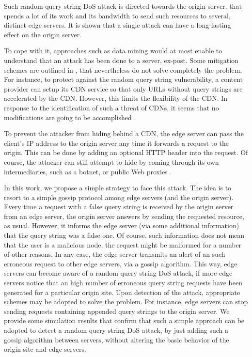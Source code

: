\documentclass{IEEEtran}
\begin{document}
Such random query string DoS attack is directed towards the origin server, that spends a lot of its work and its bandwidth to send such resources to several, distinct edge servers.
It is shown that a single attack can have a long-lasting effect on the origin server. 

To cope with it, approaches such as data mining would at most enable to understand that an attack has been done to a server, ex-post.
Some mitigation schemes are outlined in \cite{original}, that nevertheless do not solve completely the problem. 
For instance, to protect against the random query string vulnerability, a content provider can setup its CDN service so that only URLs without query strings are accelerated by the CDN. However, this limits the flexibility of the CDN. In response to the identification of such a threat of CDNs, it seems that no modifications are going to be accomplished \cite{spectrum}.

To prevent the attacker from hiding behind a CDN, the edge server can pass
the client's IP address to the origin server any time it forwards a request to the
origin. This can be done by adding an optional HTTP header into the request.
Of course, the attacker can still attempt to hide by coming through its own intermediaries, such as a botnet, or public Web proxies \cite{Ager:2010,original}. 

In this work, we propose a simple strategy to face this attack. The idea is to resort to a simple gossip protocol among edge servers (and the origin server). Every time a request with a false query string is received by the origin server from an edge server, the origin server answers by sending the requested resource, as usual. However, it informs the edge server (via some additional information) that the query string was a false one. Of course, such information does not mean that the user is a malicious node, the request might be malformed for a number of other reasons. In any case, the edge server transmits an alert of an such erroneous request to other edge servers, via a gossip algorithm. This way, edge servers can become aware of a random query string DoS attack, if more edge servers notice that an high number of erroneous query string requests have been generated for a particular origin site. Upon detection of the attack, appropriate schemes may be adopted to solve the problem. For instance, edge servers can stop sending requests containing appended query strings to the origin server. We provide some simulation results that confirm that such a simple approach can be adopted to detect a random query string DoS attack, by just adding such a gossip algorithm between servers, without altering the basic behavior of the origin site and edge servers.
\end{document}
